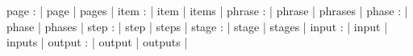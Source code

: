 \DefNoun  page              : | page               | pages                      |
\DefNoun  item              : | item               | items                      |
\DefNoun  phrase            : | phrase             | phrases                    |
\DefNoun  phase             : | phase              | phases                     |
\DefNoun  step              : | step               | steps                      |
\DefNoun  stage             : | stage              | stages                     |
\DefNoun  input             : | input              | inputs                     |
\DefNoun  output            : | output             | outputs                    |
